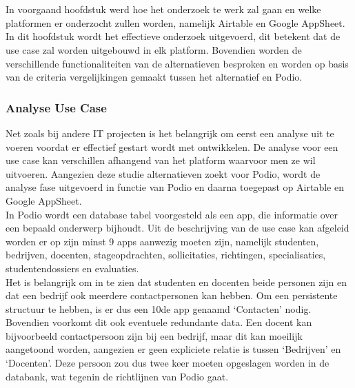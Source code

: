 
\chapter{}%
\label{ch:onderzoek}

In voorgaand hoofdstuk werd hoe het onderzoek te werk zal gaan en welke platformen er onderzocht zullen worden, namelijk Airtable en Google AppSheet. In dit hoofdstuk wordt het effectieve onderzoek uitgevoerd, dit betekent dat de use case zal worden uitgebouwd in elk platform. Bovendien worden de verschillende functionaliteiten van de alternatieven besproken en worden op basis van de criteria vergelijkingen gemaakt tussen het alternatief en Podio.

\subsection{Analyse Use Case}

Net zoals bij andere IT projecten is het belangrijk om eerst een analyse uit te voeren voordat er effectief gestart wordt met ontwikkelen. De analyse voor een use case kan verschillen afhangend van het platform waarvoor men ze wil uitvoeren. Aangezien deze studie alternatieven zoekt voor Podio, wordt de analyse fase uitgevoerd in functie van Podio en daarna toegepast op Airtable en Google AppSheet. \\

In Podio wordt een database tabel voorgesteld als een app, die informatie over een bepaald onderwerp bijhoudt. Uit de beschrijving van de use case kan afgeleid worden er op zijn minst 9 apps aanwezig moeten zijn, namelijk studenten, bedrijven, docenten, stageopdrachten, sollicitaties, richtingen, specialisaties, studentendossiers en evaluaties. \\

Het is belangrijk om in te zien dat studenten en docenten beide personen zijn en dat een bedrijf ook meerdere contactpersonen kan hebben. Om een persistente structuur te hebben, is er dus een 10de app genaamd ‘Contacten’ nodig. Bovendien voorkomt dit ook eventuele redundante data. Een docent kan bijvoorbeeld contactpersoon zijn bij een bedrijf, maar dit kan moeilijk aangetoond worden, aangezien er geen expliciete relatie is tussen ‘Bedrijven’ en ‘Docenten’. Deze persoon zou dus twee keer moeten opgeslagen worden in de databank, wat tegenin de richtlijnen van Podio gaat. \\

